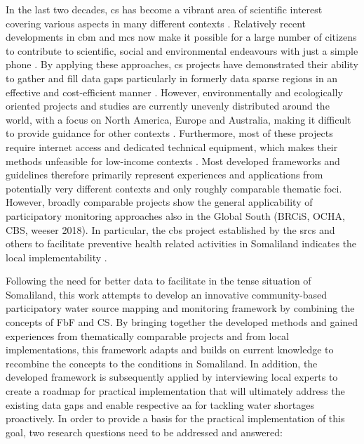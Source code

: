 In the last two decades, \acrfull{cs} has become a vibrant area of scientific interest covering various aspects in many different contexts \autocite{kirschkeCitizenScienceProjects2022,kullenbergWhatCitizenScience2016}. Relatively recent developments in \acrlong{cbm} and \acrlong{mcs} now make it possible for a large number of citizens to contribute to scientific, social and environmental endeavours with just a simple phone \autocite{butteFrameworkWaterSecurity2022}. By applying these approaches, \acrshort{cs} projects have demonstrated their ability to gather and fill data gaps particularly in formerly data sparse regions in an effective and cost-efficient manner \autocite{butteFrameworkWaterSecurity2022,lackstromBackyardHydroclimatologyCitizen2022,weeserCitizenSciencePioneers2018a}. However, environmentally and ecologically oriented projects and studies are currently unevenly distributed around the world, with a focus on North America, Europe and Australia, making it difficult to provide guidance for other contexts \autocite{kirschkeCitizenScienceProjects2022, koehlerCitizenParticipationCollaborative2008, livinglakescanadaElevatingCommunityBased2018}. Furthermore, most of these projects require internet access and dedicated technical equipment, which makes their methods unfeasible for low-income contexts \autocite{fienenSocialWaterCrowdsourcing2012a,lackstromBackyardHydroclimatologyCitizen2022,lowryGrowingPainsCrowdsourced2019}.\newline
Most developed frameworks and guidelines therefore primarily represent experiences and applications from potentially very different contexts and only roughly comparable thematic foci. However, broadly comparable projects show the general applicability of participatory monitoring approaches also in the Global South (BRCiS, OCHA, CBS, weeser 2018). In particular, the \acrlong{cbs} project established by the \acrshort{srcs} and others to facilitate preventive health related activities in Somaliland indicates the local implementability \autocite{ifrcCommunityBasedSurveillanceGuiding2017,scrsFeasibilityStudyPotential2022}.\newline

Following the need for better data to facilitate  in the tense situation of Somaliland, this work attempts to develop an innovative community-based participatory water source mapping and monitoring framework by combining the concepts of FbF and CS. By bringing together the developed methods and gained experiences from thematically comparable projects and from local implementations, this framework adapts and builds on current knowledge to recombine the concepts to the conditions in Somaliland. In addition, the developed framework is subsequently applied by interviewing local experts to create a roadmap for practical implementation that will ultimately address the existing data gaps and enable respective \acrshort{aa} for tackling water shortages proactively. In order to provide a basis for the practical implementation of this goal, two research questions need to be addressed and answered:

